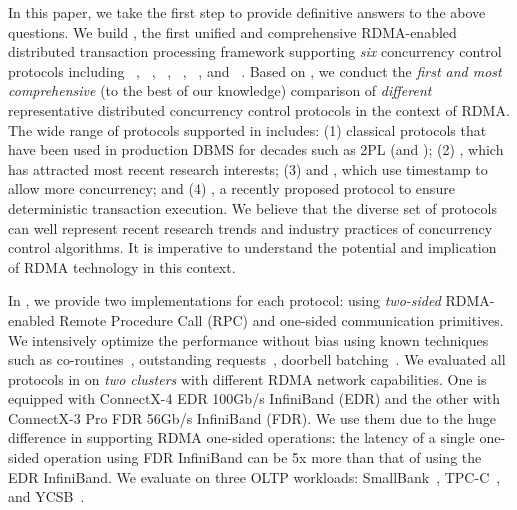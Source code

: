In this paper, we take the first step to
provide definitive answers to the above questions. 
We build {\em \projectname}, the first
unified and comprehensive RDMA-enabled distributed transaction processing framework supporting 
{\em six} concurrency control protocols including
\nowait~\cite{Bernstein:1981:CCD:356842.356846}, \waitdie~\cite{Bernstein:1981:CCD:356842.356846}, \occ~\cite{kung1981optimistic}, \mvcc~\cite{bernstein1983multiversion}, \sundial~\cite{yu2018sundial}, and 
\calvin~\cite{Thomson:2012:CFD:2213836.2213838}.
Based on \projectname, we conduct the {\em first
and most comprehensive} 
(to the best of our knowledge) comparison
of {\em different} representative distributed
concurrency control protocols in the context 
of RDMA. 
The wide range of protocols supported in \projectname includes: (1) classical protocols
that have been used in production DBMS
for decades such as 2PL (\nowait and \waitdie);
(2) \occ, which has attracted most recent research 
interests; (3) \mvcc and \sundial,
which use timestamp to allow more concurrency;
and (4) \calvin, a recently proposed protocol
to ensure deterministic transaction execution.
We believe that the diverse set of protocols
can well represent recent 
research trends and industry
practices of concurrency control algorithms.
It is imperative to understand
the potential and implication of RDMA technology
in this context. 


In \projectname, we provide two implementations
for each protocol: using {\em two-sided} 
RDMA-enabled Remote Procedure Call (RPC)
and one-sided communication primitives.
We intensively optimize the performance
without bias
using known techniques such as co-routines~\cite{kalia2016fasst}, outstanding requests~\cite{wei2018deconstructing},
doorbell batching~\cite{kalia2016design}.
We evaluated all protocols in \projectname
on {\em two clusters} with different 
RDMA network capabilities.
One is equipped with ConnectX-4 EDR 100Gb/s InfiniBand (EDR) and the other with ConnectX-3 Pro FDR 56Gb/s InfiniBand (FDR).
We use them due to the huge difference in supporting RDMA one-sided operations: the latency of a single one-sided operation using FDR InfiniBand can be 5x more than that of using the EDR InfiniBand. We evaluate \projectname on three OLTP workloads: 
SmallBank~\cite{SmallBank}, TPC-C~\cite{TPC-C}, and
YCSB~\cite{cooper2010benchmarking}. 

